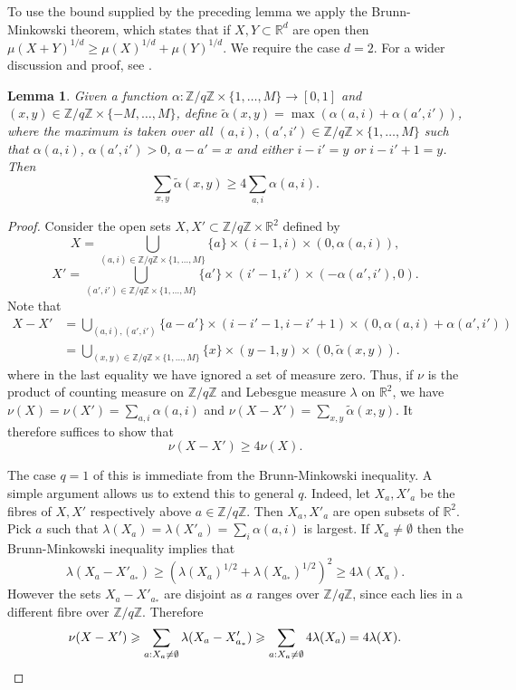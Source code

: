\documentclass[10pt,reqno]{amsart}
\newtheorem{lemma}[theorem]{Lemma}
\theoremstyle{definition}
\theoremstyle{remark}
\renewcommand{\geq}{\geqslant}
\def\R{\mathbb{R}}
\def\Z{\mathbb{Z}}
\numberwithin{equation}{section}
\begin{document}
To use the bound supplied by the preceding lemma we apply the Brunn-Minkowski theorem, which states that if $X, Y \subset \R^d$ are open then $\mu(X + Y)^{1/d} \geq \mu(X)^{1/d} + \mu(Y)^{1/d}$. We require the case $d = 2$. For a wider discussion and proof, see \cite{brunn-minkowski-survey}.

\begin{lemma}\label{doubling-4}
Given a function $\alpha : \Z/q\Z \times \{1,\dots,M\} \to [0,1]$ and $(x,y) \in \Z/q\Z\times \{-M,\dots, M\}$, define $\tilde \alpha(x,y) = \max (\alpha(a,i) + \alpha(a',i'))$, where the maximum is taken over all $(a,i), (a',i')\in\Z/q\Z\times\{1,\dots,M\}$ such that $\alpha(a,i)$, $\alpha(a',i')>0$, $a-a' = x$ and either $i-i' = y$ or $i - i' + 1 = y$. Then
\[ \sum_{x,y} \tilde \alpha(x,y) \geq 4 \sum_{a,i} \alpha(a,i).\]
\end{lemma}
\begin{proof}
Consider the open sets $X, X' \subset \Z/q\Z\times\R^2$ defined by
\[ X = \bigcup_{(a,i) \in \Z/q\Z \times\{1,\dots,M\}} \{a\} \times (i-1, i) \times (0, \alpha(a,i)),\]
\[ X' = \bigcup_{(a',i') \in \Z/q\Z \times\{1,\dots,M\}} \{a'\} \times (i'-1, i') \times (-\alpha(a',i'),0).\]
Note that
\begin{align*} X - X' & = \bigcup_{(a,i), (a',i')} \{a - a'\} \times (i - i' - 1, i - i' + 1) \times (0, \alpha(a,i) + \alpha(a', i')) \\ 
& = \bigcup_{(x,y) \in \Z/q\Z \times \{1,\dots,M\}} \{x\} \times (y-1, y) \times (0, \tilde\alpha(x,y)).\end{align*}
where in the last equality we have ignored a set of measure zero. Thus, if $\nu$ is the product of counting measure on $\Z/q\Z$ and Lebesgue measure $\lambda$ on $\R^2$, we have $\nu(X) = \nu(X') = \sum_{a,i} \alpha(a,i)$ and $\nu(X - X') = \sum_{x,y} \tilde\alpha(x,y)$.
It therefore suffices to show that \[\label{bm}  \nu(X - X') \geq 4\nu(X).\]

The case $q = 1$ of this is immediate from the Brunn-Minkowski inequality. A simple argument allows us to extend this to general $q$. Indeed, let $X_a, X'_a$ be the fibres of $X, X'$ respectively above $a \in\Z/q\Z$. Then $X_a, X'_a$ are open subsets of $\R^2$. Pick $a$ such that $\lambda(X_a) = \lambda(X'_a) = \sum_i \alpha(a,i)$ is largest. If $X_a\neq\emptyset$ then the Brunn-Minkowski inequality implies that
\[   \lambda(X_a - X'_{a_\ast}) \geq \left(\lambda(X_a)^{1/2} + \lambda(X_{a_\ast})^{1/2}\right)^2 \geq 4\lambda(X_a). \]
However the sets $X_a - X'_{a_\ast}$ are disjoint as $a$ ranges over $\Z/q\Z$, since each lies in a different fibre over $\Z/q\Z$. Therefore
\[ \nu(X-X') \geq \sum_{a: X_a\neq\emptyset} \lambda(X_a - X'_{a_\ast}) \geq \sum_{a:X_a\neq\emptyset} 4\lambda(X_a) = 4\lambda(X).\qedhere\]
\end{proof}
\end{document}
